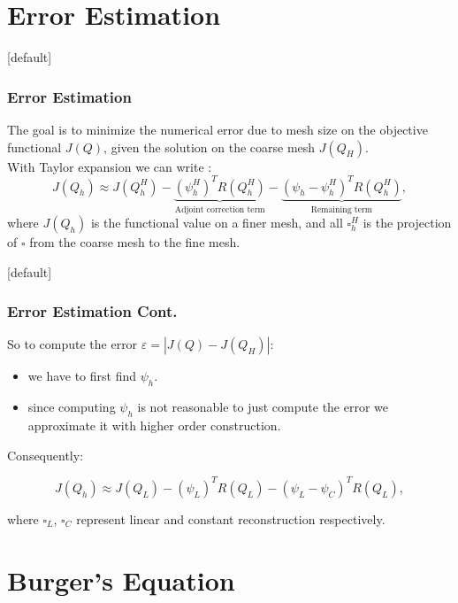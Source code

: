 \documentclass{beamer}
\makeatletter
\newenvironment{withoutheadline}{
        \setbeamertemplate{headline}[default]
        \def\beamer@entrycode{\vspace*{-\headheight}}
    }{}
\makeatother
\begin{document}
\section{Error Estimation}
\begin{withoutheadline}
\begin{frame}\frametitle{Error Estimation} 
The goal is to minimize the numerical error due to mesh size on the objective functional $ J(Q) $, given the solution on the coarse mesh $ J(Q_H) $.\\
With Taylor expansion we can write
:
\begin{displaymath}
J(Q_h) \approx  J(Q^H_h) - \underbrace{(\psi^H_h)^T R(Q^H_h)}_\text{Adjoint correction term} - 
\underbrace{(\psi_h - \psi^H_h)^T R(Q^H_h)}_\text{Remaining term},
\end{displaymath}
where $ J(Q_h) $ is the functional value on a finer mesh, and all $\square^H_h$ is the projection of $\square$ from the coarse mesh to the fine mesh.
\end{frame}
\end{withoutheadline}
\begin{withoutheadline}
\begin{frame}\frametitle{Error Estimation Cont.} 
So to compute the error $ \varepsilon = |J(Q) - J(Q_H)| $:
\begin{itemize}
\item we have to first find $\psi_h$.
\item since computing $\psi_h$ is not reasonable to just compute the error we approximate it with higher order construction.
\end{itemize}
Consequently:

\begin{displaymath}
J(Q_h) \approx  J(Q_L) - (\psi_L)^T R(Q_L) - (\psi_L - \psi_C)^T R(Q_L),
\end{displaymath}

where $\square_L$, $\square_C$ represent linear and constant reconstruction respectively.

\end{frame}
\end{withoutheadline}
\section{Burger's Equation}
\end{document}
